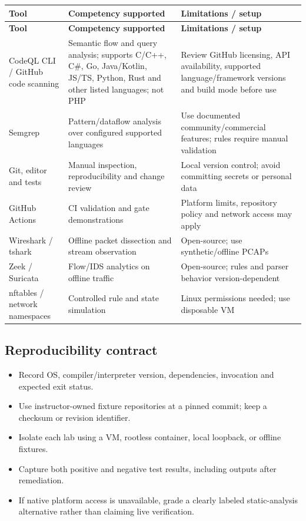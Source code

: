 \documentclass[10pt,letterpaper]{article}
\begin{document}
\begingroup\footnotesize\setlength\tabcolsep{3pt}
\begin{longtable}{>{\raggedright\arraybackslash}p{}>{\raggedright\arraybackslash}p{}>{\raggedright\arraybackslash}p{}}\toprule
\textbf{Tool} & \textbf{Competency supported} & \textbf{Limitations / setup}\\\midrule\endfirsthead
\toprule \textbf{Tool} & \textbf{Competency supported} & \textbf{Limitations / setup}\\\midrule\endhead
CodeQL CLI / GitHub code scanning & Semantic flow and query analysis; supports C/C++, C\#, Go, Java/Kotlin, JS/TS, Python, Rust and other listed languages; not PHP & Review GitHub licensing, API availability, supported language/framework versions and build mode before use\\\midrule
Semgrep & Pattern/dataflow analysis over configured supported languages & Use documented community/commercial features; rules require manual validation\\\midrule
Git, editor and tests & Manual inspection, reproducibility and change review & Local version control; avoid committing secrets or personal data\\\midrule
GitHub Actions & CI validation and gate demonstrations & Platform limits, repository policy and network access may apply\\\midrule
Wireshark / tshark & Offline packet dissection and stream observation & Open-source; use synthetic/offline PCAPs\\\midrule
Zeek / Suricata & Flow/IDS analytics on offline traffic & Open-source; rules and parser behavior version-dependent\\\midrule
nftables / network namespaces & Controlled rule and state simulation & Linux permissions needed; use disposable VM\\\midrule
\bottomrule\end{longtable}\endgroup
\subsection{Reproducibility contract}
\begin{itemize}[leftmargin=*,itemsep=2pt]
\item Record OS, compiler/interpreter version, dependencies, invocation and expected exit status.
\item Use instructor-owned fixture repositories at a pinned commit; keep a checksum or revision identifier.
\item Isolate each lab using a VM, rootless container, local loopback, or offline fixtures.
\item Capture both positive and negative test results, including outputs after remediation.
\item If native platform access is unavailable, grade a clearly labeled static-analysis alternative rather than claiming live verification.
\end{itemize}
\end{document}
